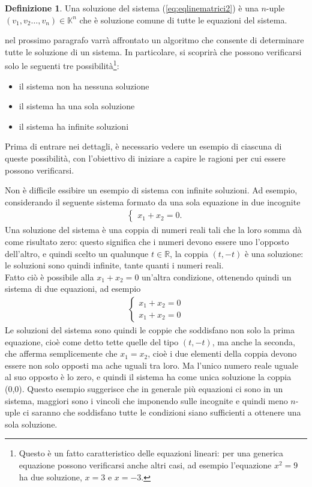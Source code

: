 \documentclass{book}
\theoremstyle{definition}
\newtheorem{defi}{Definizione}[section]
\theoremstyle{plain}
\begin{document}
\begin{defi}
  \label{defi:eqlinematrici2}
  Una soluzione del sistema (\ref{eq:eqlinematrici2}) è una $n$-uple
  $(v_1,v_2\dots,v_n) \in \mathds{K}^n$ che è soluzione comune di tutte le
  equazioni del sistema.

  nel prossimo paragrafo varrà affrontato un algoritmo che consente di
  determinare tutte le soluzione di un sistema. In particolare, si
  scoprirà che possono verificarsi solo le seguenti tre
  possibilità\footnote{Questo è un fatto caratteristico delle equazioni
    lineari: per una generica equazione possono verificarsi anche altri
    casi, ad esempio l'equazione $x^2=9$ ha due soluzione, $x=3$ e
    $x=-3$.}:
  \begin{itemize}
  \item il sistema non ha nessuna soluzione
  \item il sistema ha una sola soluzione
  \item il sistema ha infinite soluzioni
  \end{itemize}
  Prima di entrare nei dettagli, è necessario vedere un esempio di
  ciascuna di queste possibilità, con l'obiettivo di iniziare a capire le
  ragioni per cui essere possono verificarsi.

  Non è difficile essibire un esempio di sistema con infinite soluzioni.
  Ad esempio, considerando il seguente sistema formato da una sola
  equazione in due incognite
  \begin{eqnarray*}
    \begin{cases}
      x_1+x_2=0.
    \end{cases} 
  \end{eqnarray*}
  Una soluzione del sistema è una coppia di numeri reali tali che la
  loro somma dà come risultato zero: questo significa che i numeri
  devono essere uno l'opposto dell'altro, e quindi scelto un qualunque
  $t\in \mathds{R}$, la coppia $(t,-t)$ è una soluzione: le soluzioni
  sono quindi infinite, tante quanti i numeri reali.\\
  Fatto ciò è possibile alla $x_1+x_2=0$ un'altra condizione, ottenendo
  quindi un sistema di due equazioni, ad esempio
  \begin{eqnarray}
    \label{eq:eqlinematrici3}
    \begin{cases}
      x_1+x_2=0 \\
      x_1+x_2=0
    \end{cases} 
  \end{eqnarray}
  Le soluzioni del sistema sono quindi le coppie che soddisfano non solo
  la prima equazione, cioè come detto tette quelle del tipo $(t,-t)$, ma
  anche la seconda, che afferma semplicemente che $x_1=x_2$, cioè i due
  elementi della coppia devono essere non solo opposti ma ache uguali tra
  loro. Ma l'unico numero reale uguale al suo opposto è lo zero, e quindi
  il sistema ha come unica soluzione la coppia (0,0). Questo esempio
  suggerisce che in generale più equazioni ci sono in un sistema,
  maggiori sono i vincoli che imponendo sulle incognite e quindi meno
  $n$-uple ci saranno che soddisfano tutte le condizioni siano sufficienti
  a ottenere una sola soluzione.


\end{defi}
\end{document}
